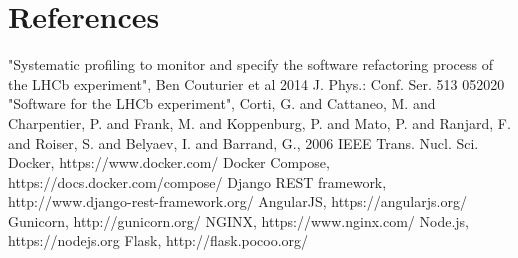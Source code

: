 \documentclass[a4paper]{jpconf}
\begin{document}
\section*{References}
\begin{thebibliography}{9}
 "Systematic profiling to monitor and specify the software refactoring process of the LHCb experiment", Ben
Couturier et al 2014 J. Phys.: Conf. Ser. 513 052020
 "Software for the LHCb experiment", Corti, G. and Cattaneo, M. and Charpentier, P. and Frank,
M. and Koppenburg, P. and Mato, P. and Ranjard, F. and
Roiser, S. and Belyaev, I. and Barrand, G., 2006 IEEE
Trans. Nucl. Sci.
 Docker, https://www.docker.com/
 Docker Compose, https://docs.docker.com/compose/
 Django REST framework, http://www.django-rest-framework.org/
 AngularJS, https://angularjs.org/
 Gunicorn, http://gunicorn.org/
 NGINX, https://www.nginx.com/
 Node.js, https://nodejs.org
 Flask, http://flask.pocoo.org/
\end{thebibliography}
\end{document}
